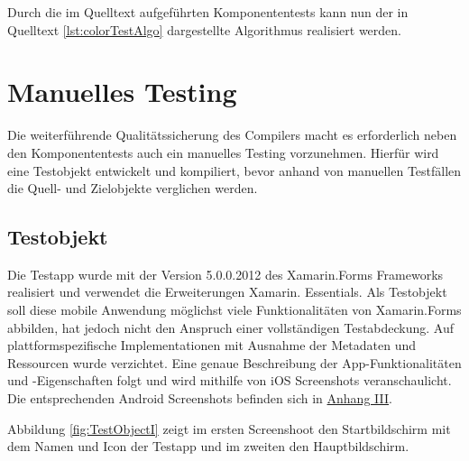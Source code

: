 Durch die im Quelltext aufgeführten Komponententests kann nun der in Quelltext \ref{lst:colorTestAlgo} dargestellte Algorithmus realisiert werden. 
\newpage



\section{Manuelles Testing}
Die weiterführende Qualitätssicherung des Compilers macht es erforderlich neben den Komponententests auch ein manuelles Testing vorzunehmen. Hierfür wird eine Testobjekt entwickelt und kompiliert, bevor anhand von manuellen Testfällen die Quell- und Zielobjekte verglichen werden.

\subsection{Testobjekt}
Die Testapp wurde mit der Version 5.0.0.2012 des Xamarin.Forms Frameworks realisiert und verwendet die Erweiterungen Xamarin. Essentials.  Als Testobjekt soll diese mobile Anwendung möglichst viele Funktionalitäten von Xamarin.Forms abbilden,  hat jedoch nicht den Anspruch einer vollständigen Testabdeckung.
Auf plattformspezifische Implementationen mit Ausnahme der Metadaten und Ressourcen wurde verzichtet.  Eine genaue Beschreibung der App-Funktionalitäten und -Eigenschaften folgt und wird mithilfe von iOS Screenshots veranschaulicht.  Die entsprechenden Android Screenshots befinden sich in \hyperref[chap:AnhangAndroidScreenshots]{Anhang III}.  

Abbildung \ref{fig:TestObjectI} zeigt im ersten Screenshoot den Startbildschirm mit dem Namen und Icon der Testapp und im zweiten den Hauptbildschirm.  


